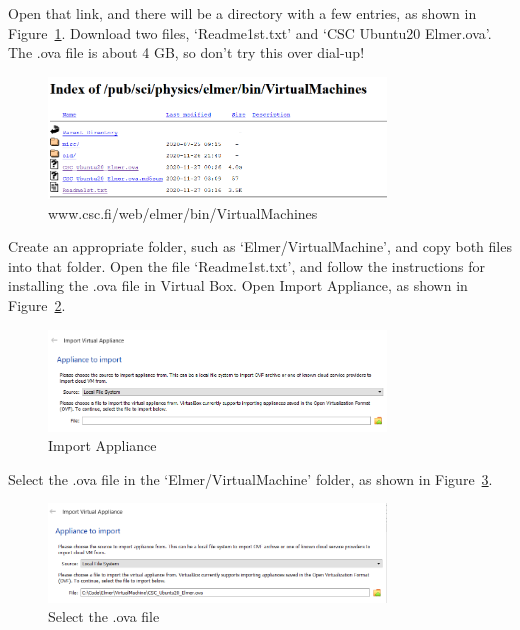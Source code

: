 Open that link, and there will be a directory with a few entries, as shown in Figure~\ref{fg:virt-1}.  Download two files, `Readme1st.txt' and  `CSC Ubuntu20 Elmer.ova'.  The .ova file is about 4 GB, so don't try this over dial-up!\\

\begin{figure}[H]
\begin{center}
\includegraphics[width=0.8\textwidth]{virt-1}
\caption{www.csc.fi/web/elmer/bin/VirtualMachines}\label{fg:virt-1}
\end{center}
\end{figure}

Create an appropriate folder, such as `Elmer/VirtualMachine', and copy both files into that folder.  Open the file `Readme1st.txt', and follow the instructions for installing the .ova file in Virtual Box.  Open Import Appliance, as shown in Figure~\ref{fg:virt-2}.

\begin{figure}[H]
\begin{center}
\includegraphics[width=0.8\textwidth]{virt-2}
\caption{Import Appliance}\label{fg:virt-2}
\end{center}
\end{figure}

Select the .ova file in the `Elmer/VirtualMachine' folder, as shown in Figure~\ref{fg:virt-3}. 

\begin{figure}[H]
\begin{center}
\includegraphics[width=0.8\textwidth]{virt-3}
\caption{Select the .ova file}\label{fg:virt-3}
\end{center}
\end{figure}

